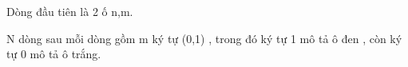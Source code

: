 Dòng đầu tiên là 2 ố n,m.

N dòng sau mỗi dòng gồm m ký tự (0,1) , trong đó ký tự 1 mô tả ô đen , còn ký tự 0 mô tả ô trắng.

\